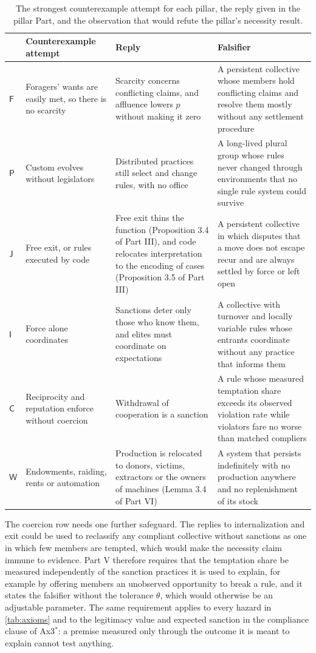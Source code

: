 \documentclass[11pt,letterpaper]{article}
\theoremstyle{definition}
\theoremstyle{remark}
\newcommand{\pF}{\mathsf{F}}
\newcommand{\pP}{\mathsf{P}}
\newcommand{\pJ}{\mathsf{J}}
\newcommand{\pI}{\mathsf{I}}
\newcommand{\pC}{\mathsf{C}}
\newcommand{\pW}{\mathsf{W}}
\begin{document}
\begin{table}[!htbp]
\centering
\small
\caption{The strongest counterexample attempt for each pillar, the reply given in the pillar Part, and the observation that would refute the pillar's necessity result.}
\label{tab:falsifiers}
\begin{tabularx}{\textwidth}{@{}L{0.7cm}YYY@{}}
\toprule
 & Counterexample attempt & Reply & Falsifier \\
\midrule
$\pF$ & Foragers' wants are easily met, so there is no scarcity \citep{sahlins1972b} & Scarcity concerns conflicting claims, and affluence lowers $p$ without making it zero & A persistent collective whose members hold conflicting claims and resolve them mostly without any settlement procedure \\
$\pP$ & Custom evolves without legislators \citep{hayek1973,ellickson1991} & Distributed practices still select and change rules, with no office & A long-lived plural group whose rules never changed through environments that no single rule system could survive \\
$\pJ$ & Free exit, or rules executed by code & Free exit thins the function (Proposition 3.4 of Part III), and code relocates interpretation to the encoding of cases (Proposition 3.5 of Part III) & A persistent collective in which disputes that a move does not escape recur and are always settled by force or left open \\
$\pI$ & Force alone coordinates & Sanctions deter only those who know them, and elites must coordinate on expectations & A collective with turnover and locally variable rules whose entrants coordinate without any practice that informs them \\
$\pC$ & Reciprocity and reputation enforce without coercion \citep{axelrod1984,greif1993} & Withdrawal of cooperation is a sanction & A rule whose measured temptation share exceeds its observed violation rate while violators fare no worse than matched compliers \\
$\pW$ & Endowments, raiding, rents or automation & Production is relocated to donors, victims, extractors or the owners of machines (Lemma 3.4 of Part VI) & A system that persists indefinitely with no production anywhere and no replenishment of its stock \\
\bottomrule
\end{tabularx}
\end{table}

The coercion row needs one further safeguard. The replies to internalization and exit could be used to reclassify any compliant collective without sanctions as one in which few members are tempted, which would make the necessity claim immune to evidence. Part V therefore requires that the temptation share be measured independently of the sanction practices it is used to explain, for example by offering members an unobserved opportunity to break a rule, and it states the falsifier without the tolerance $\theta$, which would otherwise be an adjustable parameter. The same requirement applies to every hazard in \cref{tab:axioms} and to the legitimacy value and expected sanction in the compliance clause of Ax3$^{*}$: a premise measured only through the outcome it is meant to explain cannot test anything.
\end{document}
